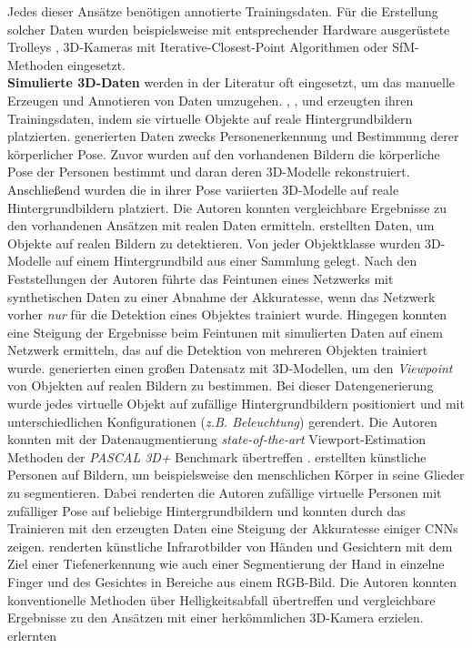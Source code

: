 Jedes dieser Ansätze benötigen annotierte Trainingsdaten. Für die Erstellung solcher Daten wurden beispielsweise mit entsprechender Hardware ausgerüstete Trolleys \cite{huitlTUMindoorExtensiveImage2012}, 3D-Kameras mit Iterative-Closest-Point Algorithmen \cite{izadiKinectFusionRealtime3D2011} oder SfM-Methoden \cite{kendallPoseNetConvolutionalNetwork2015} eingesetzt.
\\
\textbf{Simulierte 3D-Daten} werden in der Literatur oft eingesetzt, um das manuelle Erzeugen und Annotieren von Daten umzugehen. \citet{pishchulinArticulatedPeopleDetection2012a}, \citet{pengLearningDeepObject2015}, \citet{suRenderCNNViewpoint2015} und \citet{varolLearningSyntheticHumans2017} erzeugten ihren Trainingsdaten, indem sie virtuelle Objekte auf reale Hintergrundbildern platzierten. \citet{pishchulinArticulatedPeopleDetection2012a} generierten Daten zwecks Personenerkennung und Bestimmung derer körperlicher Pose. Zuvor wurden auf den vorhandenen Bildern die körperliche Pose der Personen bestimmt und daran deren 3D-Modelle rekonstruiert. Anschließend wurden die in ihrer Pose variierten 3D-Modelle auf reale Hintergrundbildern platziert. Die Autoren konnten vergleichbare Ergebnisse zu den vorhandenen Ansätzen mit realen Daten ermitteln. \citet{pengLearningDeepObject2015} erstellten Daten, um Objekte auf realen Bildern zu detektieren. Von jeder Objektklasse wurden 3D-Modelle auf einem Hintergrundbild aus einer Sammlung gelegt. Nach den Feststellungen der Autoren führte das Feintunen eines Netzwerks mit synthetischen Daten zu einer Abnahme der Akkuratesse, wenn das Netzwerk vorher \textit{nur} für die Detektion eines Objektes trainiert wurde. Hingegen konnten \citet{pengLearningDeepObject2015} eine Steigung der Ergebnisse beim Feintunen mit simulierten Daten auf einem Netzwerk ermitteln, das auf die Detektion von mehreren Objekten trainiert wurde. \citet{suRenderCNNViewpoint2015} generierten einen großen Datensatz mit 3D-Modellen, um den \textit{Viewpoint} von Objekten auf realen Bildern zu bestimmen. Bei dieser Datengenerierung wurde jedes virtuelle Objekt auf zufällige Hintergrundbildern positioniert und mit unterschiedlichen Konfigurationen (\textit{z.B. Beleuchtung}) gerendert. Die Autoren konnten mit der Datenaugmentierung \textit{state-of-the-art} Viewport-Estimation Methoden der \textit{PASCAL 3D+}\cite{xiangPASCALBenchmark3D2014} Benchmark übertreffen \cite{suRenderCNNViewpoint2015}. \citet{varolLearningSyntheticHumans2017} erstellten künstliche Personen auf Bildern, um beispielsweise den menschlichen Körper in seine Glieder zu segmentieren. Dabei renderten die Autoren zufällige virtuelle Personen mit zufälliger Pose auf beliebige Hintergrundbildern und konnten durch das Trainieren mit den erzeugten Daten eine Steigung der Akkuratesse einiger CNNs zeigen. \citet{fanelloLearningBeDepth2014} renderten künstliche Infrarotbilder von Händen und Gesichtern mit dem Ziel einer Tiefenerkennung wie auch einer Segmentierung der Hand in einzelne Finger und des Gesichtes in Bereiche aus einem RGB-Bild. Die Autoren konnten konventionelle Methoden über Helligkeitsabfall übertreffen und vergleichbare Ergebnisse zu den Ansätzen mit einer herkömmlichen 3D-Kamera erzielen. \citet{dosovitskiyFlowNetLearningOptical2015} erlernten 